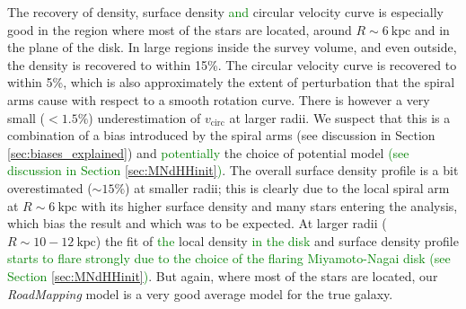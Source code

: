 \documentclass[iop,revtex4,numberedappendix,appendixfloats]{emulateapj}
\newcommand{\RM}{{\sl RoadMapping}}
\newcommand{\NEW}[1]{\textcolor{Green}{#1}}
\newcommand{\OLD}[1]{}
\begin{document}
The recovery of density, surface density\OLD{,} \NEW{and} circular velocity curve \OLD{and disk-to-halo ratio} is especially good in the region where most of the stars are located, around $R\sim6~\text{kpc}$ and in the plane of the disk. In large regions inside the survey volume, and even outside, the density is recovered to within 15\%. The circular velocity curve is recovered to within 5\%, which is also approximately the extent of perturbation that the spiral arms cause with respect to a smooth rotation curve. There is however a very small ($<1.5\%$) underestimation of $v_\text{circ}$ at larger radii. We suspect that this is a combination of a bias introduced by the spiral arms (see \OLD{also} discussion in Section \OLD{\ref{sec:forces_bias}}\NEW{\ref{sec:biases_explained}}) and \NEW{potentially} the choice of potential model \OLD{(as a similar bias shows up in the \texttt{DEHH-Pot})}\NEW{(see discussion in Section \ref{sec:MNdHHinit})}. The overall surface density profile is a bit overestimated ($\sim 15\%$) at smaller radii; this is clearly due to the local spiral arm at $R\sim6~\text{kpc}$ with its higher surface density and many stars entering the analysis, which bias the result and which was to be expected. At larger radii ($R\sim10-12~\text{kpc}$) the fit of \OLD{radial}\NEW{the} local density \NEW{in the disk} and surface density profile \OLD{is not as accurate, which we ascribe to the Miyamoto-Nagai disk having a shallower radial profile than an exponential disk, and not enough stars in these outer regions to give good constraints}\NEW{starts to flare strongly due to the choice of the flaring Miyamoto-Nagai disk (see Section \ref{sec:MNdHHinit})}. \OLD{The much stronger bias in the disk-to-halo ratio at larger radii is the result of a misjudgement of the halo scale length. As we will see later (in Section \ref{sec:parameter recovery} and Figure \ref{fig:model_parameters}) we seem to need an even larger survey volume to have enough radial coverage to constrain the halo scale length properly.} But again, where most of the stars are located, our \RM{} model is a very good average model for the true galaxy.
\end{document}
